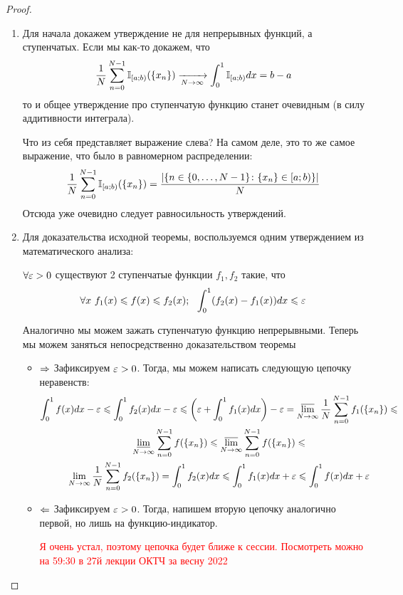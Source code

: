 \begin{proof}
	\begin{enumerate}
		\item Для начала докажем утверждение не для непрерывных функций, а ступенчатых. Если мы как-то докажем, что
		\[
			\frac{1}{N} \sum\limits_{n = 0}^{N - 1} \mathbb{I}_{[a; b)} (\{x_n\}) \xrightarrow[N \to \infty]{} \int_0^1 \mathbb{I}_{[a; b)} dx = b - a
		\]
		то и общее утверждение про ступенчатую функцию станет очевидным (в силу аддитивности интеграла).
		
		Что из себя представляет выражение слева? На самом деле, это то же самое выражение, что было в равномерном распределении:
		\[
			\frac{1}{N} \sum\limits_{n = 0}^{N - 1} \mathbb{I}_{[a; b)} (\{x_n\}) = \frac{|\{n \in \{0, \ldots, N - 1\} \colon \{x_n\} \in [a; b)\}|}{N}
		\]
		Отсюда уже очевидно следует равносильность утверждений.
		
		\item Для доказательства исходной теоремы, воспользуемся одним утверждением из математического анализа:
		\begin{proposition}
			$\forall \varepsilon > 0$ существуют 2 ступенчатые функции $f_1, f_2$ такие, что
			\[
				\forall x \ f_1(x) \leqslant f(x) \leqslant f_2(x); \ \ \int_0^1 (f_2(x) - f_1(x))dx \leqslant \varepsilon
			\]
		\end{proposition}
		Аналогично мы можем зажать ступенчатую функцию непрерывными. Теперь мы можем заняться непосредственно доказательством теоремы
		\begin{itemize}
			\item $\Rightarrow$ Зафиксируем $\varepsilon > 0$. Тогда, мы можем написать следующую цепочку неравенств:
			\begin{multline*}
				\int_0^1 f(x)dx - \varepsilon \leqslant \int_0^1 f_2(x)dx - \varepsilon \leqslant \left(\varepsilon + \int_0^1 f_1(x)dx\right) - \varepsilon = \varlimsup\limits_{N \to \infty} \frac{1}{N} \sum\limits_{n = 0}^{N - 1} f_1(\{x_n\}) \leqslant
				\\
				\varliminf\limits_{N \to \infty} \sum\limits_{n = 0}^{N - 1} f(\{x_n\}) \leqslant \varlimsup\limits_{N \to \infty} \sum\limits_{n = 0}^{N - 1} f(\{x_n\}) \leqslant
				\\
				\lim\limits_{N \to \infty} \frac{1}{N} \sum\limits_{n = 0}^{N - 1} f_2(\{x_n\}) = \int_0^1 f_2(x)dx \leqslant \int_0^1 f_1(x)dx + \varepsilon \leqslant \int_0^1 f(x)dx + \varepsilon
			\end{multline*}
			
			\item $\Leftarrow$ Зафиксируем $\varepsilon > 0$. Тогда, напишем вторую цепочку аналогично первой, но лишь на функцию-индикатор.
			
			\textcolor{red}{Я очень устал, поэтому цепочка будет ближе к сессии. Посмотреть можно на 59:30 в 27й лекции ОКТЧ за весну 2022}
		\end{itemize}
	\end{enumerate}
\end{proof}

